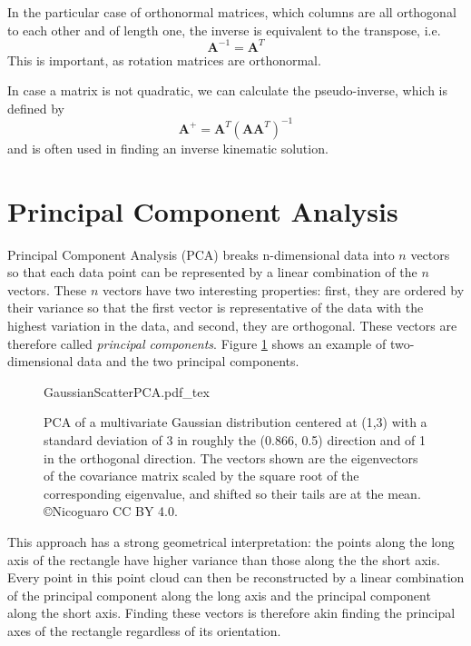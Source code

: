 In the particular case of orthonormal matrices, which columns are all orthogonal to each other and of length one, the inverse is equivalent to the transpose, i.e.
\begin{equation}
\mathbf{A}^{-1}=\mathbf{A}^T
\end{equation}
This is important, as rotation matrices are orthonormal.

In case a matrix is not quadratic, we can calculate the pseudo-inverse, which is defined by
\begin{equation}
\mathbf{A}^+=\mathbf{A}^T(\mathbf{AA}^T)^{-1}
\end{equation}
and is often used in finding an inverse kinematic solution.

\section{Principal Component Analysis}\label{sec:appendix_PCA}
Principal Component Analysis (PCA) breaks n-dimensional data into $n$ vectors so that each data point can be represented by a linear combination of the $n$ vectors. These $n$ vectors have two interesting properties: first, they are ordered by their variance so that the first vector is representative of the data with the highest variation in the data, and second, they are orthogonal. These vectors are therefore called \emph{principal components}. Figure \ref{fig:PCA} shows an example of two-dimensional data and the two principal components. 


\begin{figure}[htb]
    \centering
    \def\svgwidth{0.6\textwidth}
    {GaussianScatterPCA.pdf_tex}
    \caption{PCA of a multivariate Gaussian distribution centered at (1,3) with a standard deviation of 3 in roughly the (0.866, 0.5) direction and of 1 in the orthogonal direction. The vectors shown are the eigenvectors of the covariance matrix scaled by the square root of the corresponding eigenvalue, and shifted so their tails are at the mean. \copyright Nicoguaro CC BY 4.0.\label{fig:PCA}}
\end{figure}

This approach has a strong geometrical interpretation: the points along the long axis of the rectangle have higher variance than those along the the short axis. Every point in this point cloud can then be reconstructed by a linear combination of the principal component along the long axis and the principal component along the short axis. Finding these vectors is therefore akin finding the principal axes of the rectangle regardless of its orientation.

